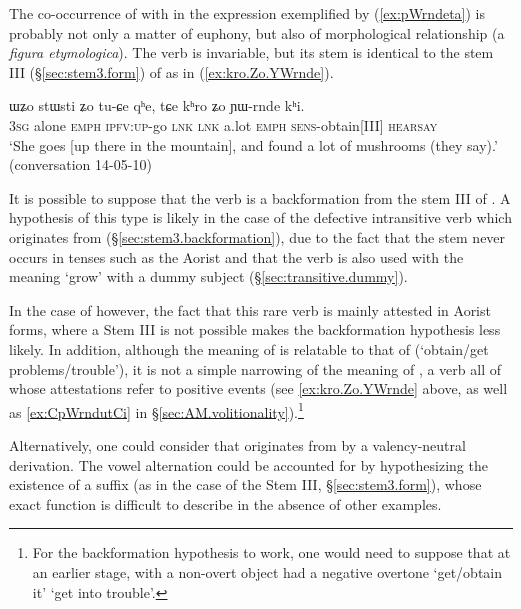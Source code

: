 The co-occurrence of  with  in the expression exemplified by (\ref{ex:pWrndeta}) is probably not only a matter of euphony, but also of morphological relationship (a \textit{figura etymologica}). The verb  is invariable, but its stem is identical to the stem III (§\ref{sec:stem3.form}) of  as in (\ref{ex:kro.Zo.YWrnde}). 

\begin{exe}
\ex \label{ex:kro.Zo.YWrnde}
\gll ɯʑo stɯsti ʑo tu-ɕe qʰe, tɕe kʰro ʑo ɲɯ-rnde kʰi. \\
\textsc{3sg} alone \textsc{emph} \textsc{ipfv}:\textsc{up}-go \textsc{lnk} \textsc{lnk} a.lot \textsc{emph} \textsc{sens}-obtain[III] \textsc{hearsay} \\
\glt `She goes [up there in the mountain], and found a lot of mushrooms (they say).' (conversation 14-05-10)
\end{exe}

It is possible to suppose that the verb  is a backformation from the stem III of . A hypothesis of this type is likely in the case of the defective intransitive verb  which originates from  (§\ref{sec:stem3.backformation}), due to the fact that the stem  never occurs in tenses such as the Aorist and that the verb  is also used with the meaning `grow' with a dummy subject (§\ref{sec:transitive.dummy}).

In the case of  however, the fact that this rare verb is mainly attested in Aorist forms, where a Stem III is not possible makes the backformation hypothesis less likely. In addition, although the meaning of  is relatable to that of  (`obtain/get problems/trouble'), it is not a simple narrowing of the meaning of , a verb all of whose attestations refer to positive events (see \ref{ex:kro.Zo.YWrnde} above, as well as \ref{ex:CpWrndutCi} in §\ref{sec:AM.volitionality}).\footnote{For the backformation hypothesis to work, one would need to suppose that at an earlier stage,  with a non-overt object had a negative overtone `get/obtain it' \fl{} `get into trouble'. }

Alternatively, one could consider that  originates from  by a valency-neutral derivation. The vowel alternation could be accounted for by hypothesizing the existence of a  suffix (as in the case of the Stem III, §\ref{sec:stem3.form}), whose exact function is difficult to describe in the absence of other examples.

 
 

